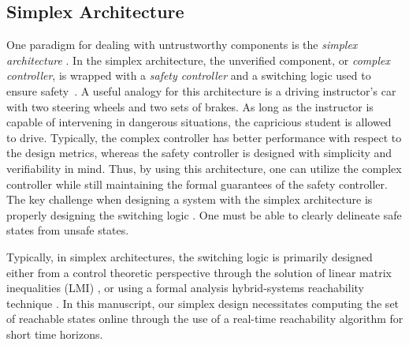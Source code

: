 \documentclass[manuscript,screen,review]{acmart}
\begin{document}
\subsection{Simplex Architecture}


One paradigm for dealing with untrustworthy components is the \emph{simplex architecture} \cite{RiveraAnArchitectural1996}. In the simplex architecture, the unverified component, or \emph{complex controller}, is wrapped with a \emph{safety controller} and a switching logic used to ensure safety~\cite{Bak2014}. A useful analogy for this architecture is a driving instructor's car with two steering wheels and two sets of brakes. As long as the instructor is capable of intervening in dangerous situations, the capricious student is allowed to drive. Typically, the complex controller has better performance with respect to the design metrics, whereas the safety controller is designed with simplicity and verifiability in mind. Thus, by using this architecture, one can utilize the complex controller while still maintaining the formal guarantees of the safety controller. The key challenge when designing a system with the simplex architecture is properly designing the switching logic \cite{Johnson2016}. One must be able to clearly delineate safe states from unsafe states. 

Typically, in simplex architectures, the switching logic is primarily designed either from a control theoretic perspective through the solution of linear matrix inequalities (LMI) \cite{SetoCaseStudy2000}, or using a formal analysis hybrid-systems reachability technique \cite{Bak2009Simplex}. In this manuscript, our simplex design necessitates computing the set of reachable states online through the use of a real-time reachability algorithm for short time horizons.
\end{document}
